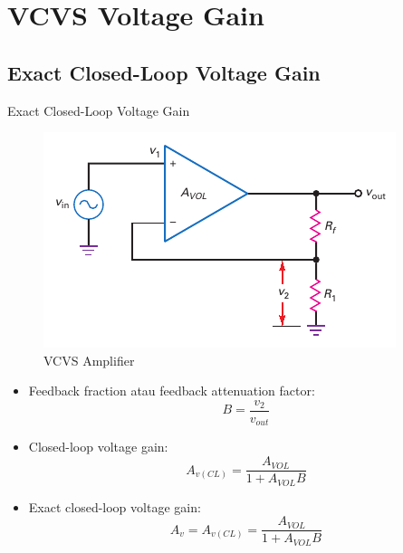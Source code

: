\section{VCVS Voltage Gain}

\subsection{Exact Closed-Loop Voltage Gain}
\begin{frame}{Exact Closed-Loop Voltage Gain}
	\begin{multicols}{2}
		\begin{figure}
			\centering
			\includegraphics[width=0.9\linewidth]{gambar/fig-17.03}
			\caption{VCVS Amplifier}
			\label{fig-17.03}
		\end{figure}
	\columnbreak
	\begin{itemize}
		\item Feedback fraction atau feedback attenuation factor:
		\begin{equation}\label{pers-17.01}
			B = \frac{v_2}{v_{out}}
		\end{equation}
		\item Closed-loop voltage gain:
		\begin{equation}\label{pers-17.02}
			A_{v(CL)} = \frac{A_{VOL}}{1 + A_{VOL}B}
		\end{equation}
		\item Exact closed-loop voltage gain:
		\begin{equation}\label{pers-17.03}
			A_v = A_{v(CL)} = \frac{A_{VOL}}{1 + A_{VOL}B}
		\end{equation}
	\end{itemize}
	\end{multicols}
\end{frame}

